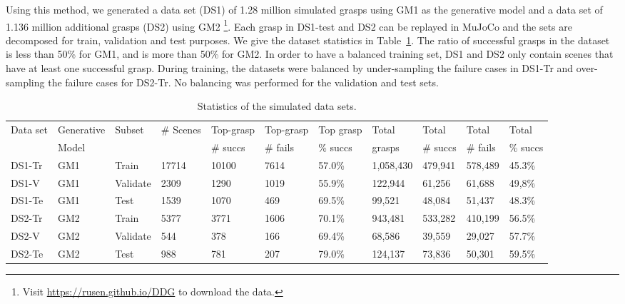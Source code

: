 Using this method, we generated a data set (DS1) of 1.28 million simulated grasps using GM1 as the generative model and a data set of 1.136 million additional grasps (DS2) using GM2 \footnote{Visit \href{https://rusen.github.io/DDG/}{https://rusen.github.io/DDG} to download the data.}. Each grasp in DS1-test and DS2 can be replayed in MuJoCo and the sets are decomposed for train, validation and test purposes. We give the dataset statistics in Table~\ref{tab:data}. The ratio of successful grasps in the dataset is less than 50\% for GM1, and is more than 50\% for GM2. In order to have a balanced training set, DS1 and DS2 only contain scenes that have at least one successful grasp. During training, the datasets were balanced by under-sampling the failure cases in DS1-Tr and over-sampling the failure cases for DS2-Tr. No balancing was performed for the validation and test sets.
\begin{table}[t]
\centering
\caption{Statistics of the simulated data sets.}
\label{tab:data}
\begin{tabular}{|l|l|l|l|l|l|l|l|l|l|l|} \hline
Data set & Generative &  Subset & \# Scenes & Top-grasp & Top-grasp & Top grasp & Total & Total  & Total  & Total \\ 
              & Model         &              &                   &  \# succs  & \# fails       & \% succs  & grasps   & \# succs      & \# fails  & \% succs  \\ \hline
 DS1-Tr & GM1 & Train & 17714 & 10100 & 7614 & 57.0\% & 1,058,430 & 479,941 & 578,489 & 45.3\% \\ \hline
 DS1-V  & GM1 & Validate & 2309 & 1290 & 1019 & 55.9\% & 122,944 & 61,256 & 61,688 & 49,8\% \\ \hline
 DS1-Te & GM1& Test & 1539 & 1070 & 469 & 69.5\% & 99,521 & 48,084 & 51,437 & 48.3\% \\ \hline
 DS2-Tr  & GM2 & Train & 5377 & 3771 & 1606 & 70.1\% & 943,481 & 533,282 & 410,199 & 56.5\% \\ \hline
 DS2-V   & GM2 & Validate & 544 & 378 & 166 & 69.4\% & 68,586 & 39,559 & 29,027 & 57.7\% \\ \hline
 DS2-Te  & GM2 & Test & 988 & 781 & 207 & 79.0\% & 124,137 & 73,836 & 50,301 & 59.5\% \\ \hline
\end{tabular}
\end{table}